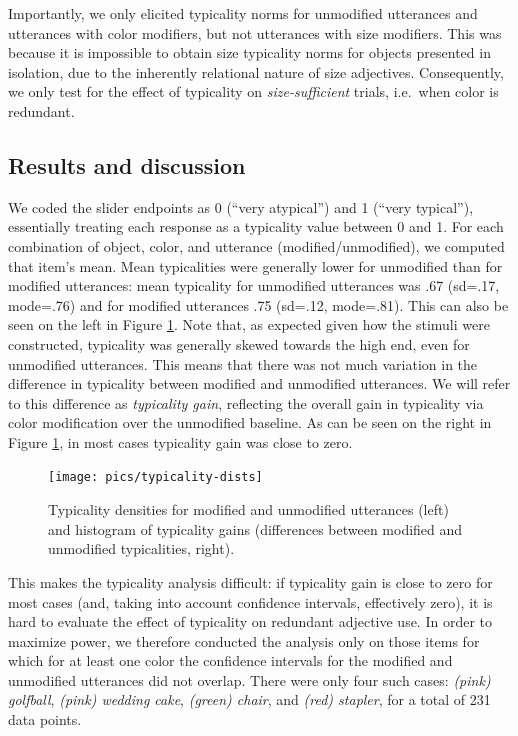 \documentclass[11pt]{article}
\newcommand{\figref}[1]{Figure \ref{#1}}
\begin{document}
Importantly, we only elicited typicality norms for unmodified utterances and utterances with color modifiers, but not utterances with size modifiers. This was because it is impossible to obtain size typicality norms for objects presented in isolation, due to the inherently relational nature of size adjectives. Consequently, we only test for the effect of typicality on \emph{size-sufficient} trials, i.e.~when color is redundant. 

\subsection{Results and discussion}

We coded the slider endpoints as 0 (``very atypical'') and 1 (``very typical''), essentially treating each response as a typicality value between 0 and 1. For each combination of object, color, and utterance (modified/unmodified), we computed that item's mean. Mean typicalities were generally lower for unmodified than for modified utterances: mean typicality for unmodified utterances was .67 (sd=.17, mode=.76) and for modified utterances .75 (sd=.12, mode=.81). This can also be seen on the left in \figref{fig:typicalitydists}. Note that, as expected given how the stimuli were constructed, typicality was generally skewed towards the high end, even for unmodified utterances. This means that there was not much variation in  the difference in typicality between modified and unmodified utterances. We will refer to this difference as \emph{typicality gain}, reflecting the overall gain in typicality via color modification over the unmodified baseline. As can be seen on the right in \figref{fig:typicalitydists}, in most cases typicality gain was close to zero.

\begin{figure}
\centering
\texttt{[image: pics/typicality-dists]}
\caption{Typicality densities for modified and unmodified utterances (left) and histogram of typicality gains (differences between modified and unmodified typicalities, right).}
\label{fig:typicalitydists}
\end{figure}

This makes the typicality analysis difficult: if typicality gain is close to zero for most cases (and, taking into account confidence intervals, effectively zero), it is hard to evaluate the effect of typicality on redundant adjective use. In order to maximize power, we therefore conducted the analysis only on those items for which for at least one color the confidence intervals for the modified and unmodified utterances did not overlap. There were only four such cases: \emph{(pink) golfball}, \emph{(pink) wedding cake}, \emph{(green) chair}, and \emph{(red) stapler}, for a total of 231 data points.
\end{document}
